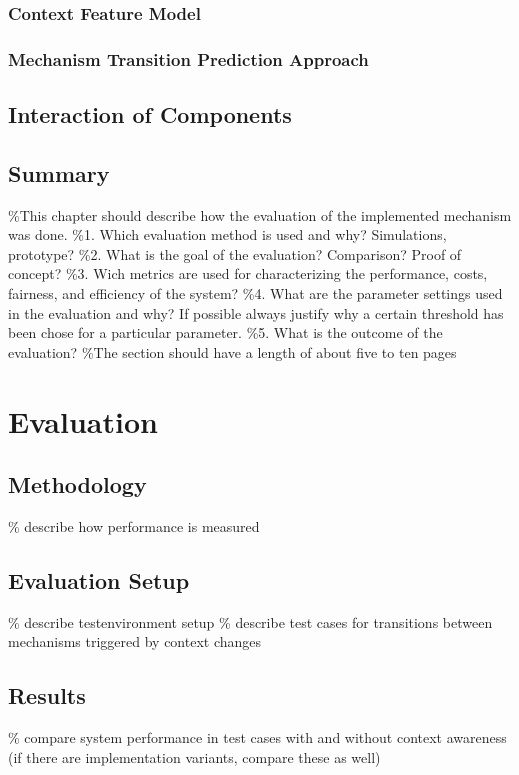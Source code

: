 \subsection{Context Feature Model}
\subsection{Mechanism Transition Prediction Approach}

\section{Interaction of Components}
\section{Summary}


\%This chapter should describe how the evaluation of the implemented mechanism was done.
\%1. Which evaluation method is used and why? Simulations, prototype?
\%2. What is the goal of the evaluation? Comparison? Proof of con\gls{cep}t?
\%3. Wich metrics are used for characterizing the performance, costs, fairness, and efficiency of the system?
\%4. What are the parameter settings used in the evaluation and why? If possible always justify why a certain threshold has been chose for a particular parameter.
\%5. What is the outcome of the evaluation?
\%The section should have a length of about five to ten pages
\chapter{Evaluation}
\section{Methodology}
\% describe how performance is measured

\section{Evaluation Setup}
\% describe testenvironment setup
\% describe test cases for transitions between mechanisms triggered by context changes

\section{Results}
\% compare system performance in test cases with and without context awareness (if there are implementation variants, compare these as well)
